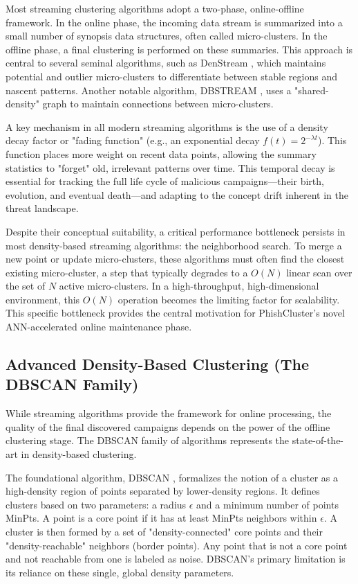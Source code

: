 \documentclass[journal,article,submit,pdftex,moreauthors]{Definitions/mdpi}
\begin{document}
Most streaming clustering algorithms adopt a two-phase, online-offline framework. In the online phase, the incoming data stream is summarized into a small number of synopsis data structures, often called micro-clusters. In the offline phase, a final clustering is performed on these summaries. This approach is central to several seminal algorithms, such as DenStream \cite{ref_denstream}, which maintains potential and outlier micro-clusters to differentiate between stable regions and nascent patterns. Another notable algorithm, DBSTREAM \cite{ref_dbstream}, uses a "shared-density" graph to maintain connections between micro-clusters.

A key mechanism in all modern streaming algorithms is the use of a density decay factor or "fading function" (e.g., an exponential decay $f(t) = 2^{-\lambda t}$). This function places more weight on recent data points, allowing the summary statistics to "forget" old, irrelevant patterns over time. This temporal decay is essential for tracking the full life cycle of malicious campaigns—their birth, evolution, and eventual death—and adapting to the concept drift inherent in the threat landscape.

Despite their conceptual suitability, a critical performance bottleneck persists in most density-based streaming algorithms: the neighborhood search. To merge a new point or update micro-clusters, these algorithms must often find the closest existing micro-cluster, a step that typically degrades to a $O(N)$ linear scan over the set of $N$ active micro-clusters. In a high-throughput, high-dimensional environment, this $O(N)$ operation becomes the limiting factor for scalability. This specific bottleneck provides the central motivation for PhishCluster's novel ANN-accelerated online maintenance phase.


\subsection{Advanced Density-Based Clustering (The DBSCAN Family)}

While streaming algorithms provide the framework for online processing, the quality of the final discovered campaigns depends on the power of the offline clustering stage. The DBSCAN family of algorithms represents the state-of-the-art in density-based clustering. 

The foundational algorithm, DBSCAN \cite{ref_dbscan_ester}, formalizes the notion of a cluster as a high-density region of points separated by lower-density regions. It defines clusters based on two parameters: a radius $\epsilon$ and a minimum number of points MinPts. A point is a core point if it has at least MinPts neighbors within $\epsilon$. A cluster is then formed by a set of "density-connected" core points and their "density-reachable" neighbors (border points). Any point that is not a core point and not reachable from one is labeled as noise. DBSCAN's primary limitation is its reliance on these single, global density parameters. 
\end{document}
